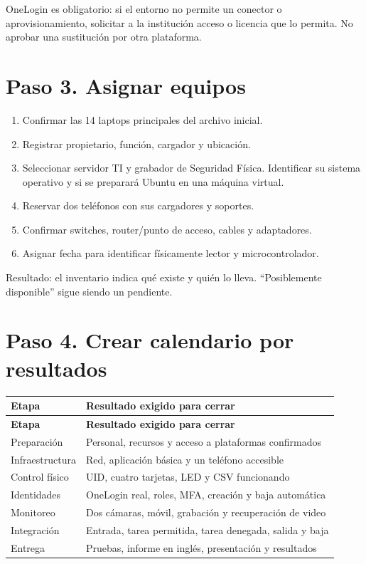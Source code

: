 \documentclass[12pt,a4paper]{article}
\begin{document}
OneLogin es obligatorio: si el entorno no permite un conector o aprovisionamiento, solicitar a la institución acceso o licencia que lo permita. No aprobar una sustitución por otra plataforma.\par
{}\section*{Paso 3. Asignar equipos}
\begin{enumerate}
\item Confirmar las 14 laptops principales del archivo inicial.
\item Registrar propietario, función, cargador y ubicación.
\item Seleccionar servidor TI y grabador de Seguridad Física. Identificar su sistema operativo y si se preparará Ubuntu en una máquina virtual.
\item Reservar dos teléfonos con sus cargadores y soportes.
\item Confirmar switches, router/punto de acceso, cables y adaptadores.
\item Asignar fecha para identificar físicamente lector y microcontrolador.
\end{enumerate}
Resultado: el inventario indica qué existe y quién lo lleva. “Posiblemente disponible” sigue siendo un pendiente.\par
{}\section*{Paso 4. Crear calendario por resultados}
{\small\renewcommand{\arraystretch}{1.2}
\begin{longtable}{p{7.760cm}p{7.760cm}}
\toprule
\textbf{Etapa} & \textbf{Resultado exigido para cerrar} \\ \midrule\endfirsthead
\textbf{Etapa} & \textbf{Resultado exigido para cerrar} \\ \midrule\endhead
Preparación & Personal, recursos y acceso a plataformas confirmados \\
Infraestructura & Red, aplicación básica y un teléfono accesible \\
Control físico & UID, cuatro tarjetas, LED y CSV funcionando \\
Identidades & OneLogin real, roles, MFA, creación y baja automática \\
Monitoreo & Dos cámaras, móvil, grabación y recuperación de video \\
Integración & Entrada, tarea permitida, tarea denegada, salida y baja \\
Entrega & Pruebas, informe en inglés, presentación y resultados \\
\bottomrule\end{longtable}}
\end{document}
